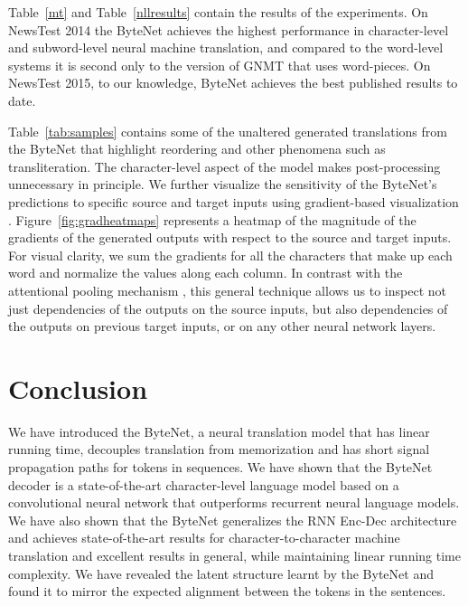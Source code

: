 Table~\ref{mt} and Table~\ref{nllresults} contain the results of the experiments. On NewsTest 2014 the ByteNet achieves the highest performance in character-level and subword-level neural machine translation, and compared to the word-level systems it is second only to the version of GNMT that uses word-pieces. On NewsTest 2015, to our knowledge, ByteNet achieves the best published results to date.

Table~\ref{tab:samples} contains some of the unaltered generated translations from the ByteNet that highlight reordering and other phenomena such as transliteration. The character-level aspect of the model makes post-processing unnecessary in principle. We further visualize the sensitivity of the ByteNet's predictions to specific source and target inputs using gradient-based visualization \citep{DBLP:journals/corr/SimonyanVZ13}. Figure~\ref{fig:gradheatmaps} represents a heatmap of the magnitude of the gradients of the generated outputs with respect to the source and target inputs. For visual clarity, we sum the gradients for all the characters that make up each word and normalize the values along each column. In contrast with the attentional pooling mechanism \citep{DBLP:journals/corr/BahdanauCB14}, this general technique allows us to inspect not just dependencies of the outputs on the source inputs, but also dependencies of the outputs on previous target inputs, or on any other neural network layers.

\section{Conclusion}

We have introduced the ByteNet, a neural translation model that has linear running time, decouples translation from memorization and has short signal propagation paths for tokens in sequences. We have shown that the ByteNet decoder is a state-of-the-art character-level language model based on a convolutional neural network that outperforms recurrent neural language models. We have also shown that the ByteNet generalizes the RNN Enc-Dec architecture and achieves state-of-the-art results for character-to-character machine translation and excellent results in general, while maintaining linear running time complexity. We have revealed the latent structure learnt by the ByteNet and found it to mirror the expected alignment between the tokens in the sentences. 


